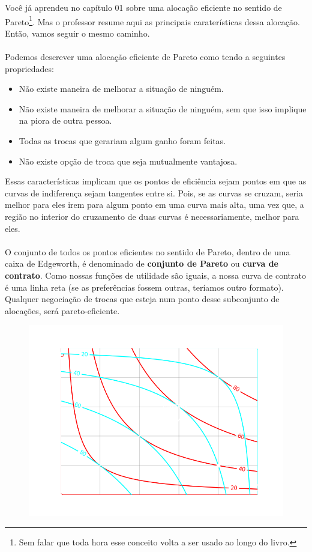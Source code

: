\documentclass[a4paper,11pt,oneside]{book}
\theoremstyle{definition}
\theoremstyle{break}
\begin{document}
Você já aprendeu no capítulo 01 sobre uma alocação eficiente no sentido de Pareto\footnote{Sem falar que toda hora esse conceito volta a ser usado ao longo do livro.}. Mas o professor resume aqui as principais caraterísticas dessa alocação. Então, vamos seguir o mesmo caminho.
\\~\\
Podemos descrever uma alocação eficiente de Pareto como tendo a seguintes propriedades:
\begin{itemize}
\item Não existe maneira de melhorar a situação de ninguém.
\item Não existe maneira de melhorar a situação de ninguém, sem que isso implique na piora de outra pessoa.
\item Todas as trocas que gerariam algum ganho foram feitas.
\item Não existe opção de troca que seja mutualmente vantajosa.
\end{itemize}

Essas características implicam que os pontos de eficiência sejam pontos em que as curvas de indiferença sejam tangentes entre si. Pois, se as curvas se cruzam, seria melhor para eles irem para algum ponto em uma curva mais alta, uma vez que, a região no interior do cruzamento de duas curvas é necessariamente, melhor para eles.
\\~\\
O conjunto de todos os pontos eficientes no sentido de Pareto, dentro de uma caixa de Edgeworth, é denominado de \textbf{conjunto de Pareto} ou \textbf{curva de contrato}. Como nossas funções de utilidade são iguais, a nossa curva de contrato é uma linha reta (se as preferências fossem outras, teríamos outro formato). Qualquer negociação de trocas que esteja num ponto desse subconjunto de alocações, será pareto-eficiente.

\begin{figure}[H]
\centering
\includegraphics[scale=0.8]{cap32_3-caixa_edgeworth_1.png}
\end{figure}
\end{document}
